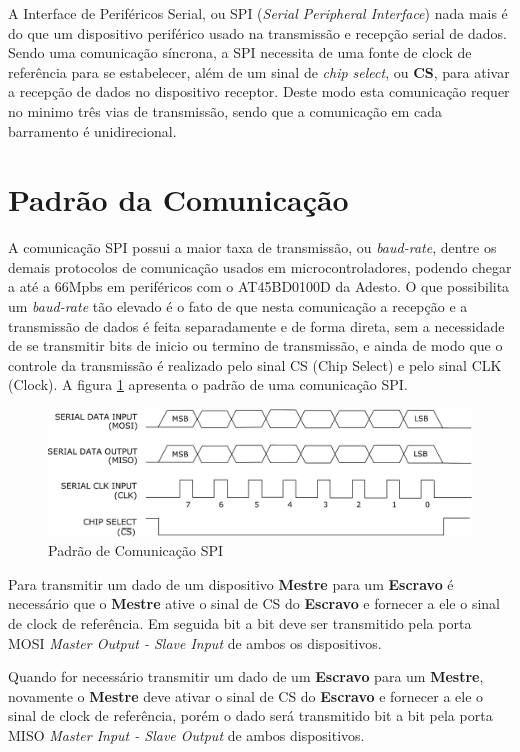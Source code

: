 A Interface de Periféricos Serial, ou SPI (\emph{Serial Peripheral Interface}) nada mais é do que um dispositivo periférico usado na transmissão e recepção serial de dados. Sendo uma comunicação síncrona, a SPI necessita de uma fonte de clock de referência para se estabelecer, além de um sinal de \emph{chip select}, ou \textbf{CS}, para ativar a recepção de dados no dispositivo receptor. Deste modo esta comunicação requer no minimo três vias de transmissão, sendo que a comunicação em cada barramento é unidirecional.

\section{Padrão da Comunicação}

A comunicação SPI possui a maior taxa de transmissão, ou \emph{baud-rate}, dentre os demais protocolos de comunicação usados em microcontroladores, podendo chegar a até a 66Mpbs em periféricos com o AT45BD0100D da Adesto. O que possibilita um  \emph{baud-rate} tão elevado é o fato de que nesta comunicação a recepção e a transmissão de dados é feita separadamente e de forma direta, sem a necessidade de se transmitir bits de inicio ou termino de transmissão, e ainda de modo que o controle da transmissão é realizado pelo sinal CS (Chip Select) e pelo sinal  CLK (Clock).  A figura \ref{fig:SPI} apresenta o padrão de uma comunicação SPI.

\begin{figure}[H]
	\centering
	\includegraphics[width=1\textwidth] {figuras/PadraoSPI.eps}
	\caption{Padrão de Comunicação SPI}
	\label{fig:SPI}
\end{figure}

Para transmitir um dado de um dispositivo \textbf{Mestre} para um \textbf{Escravo} é necessário que o \textbf{Mestre} ative o sinal de CS do \textbf{Escravo} e fornecer a ele o sinal de clock de referência. Em seguida bit a bit deve ser transmitido pela porta MOSI \emph{Master Output - Slave Input} de ambos os dispositivos. 

Quando for necessário transmitir um dado de um  \textbf{Escravo} para um \textbf{Mestre}, novamente o \textbf{Mestre} deve ativar o sinal de CS do  \textbf{Escravo} e fornecer a ele o sinal de clock de referência, porém o dado será transmitido bit a bit pela porta MISO \emph{Master Input - Slave Output} de ambos dispositivos. 

